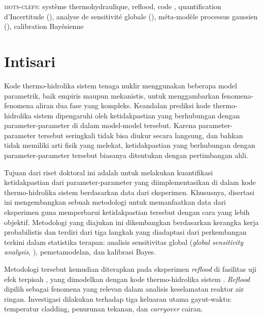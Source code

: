 \begin{otherlanguage}{ngerman}
\vfill

\textsc{mots-clefs}:
système thermohydraulique,
reflood,
code ,
quantification d'Incertitude (),
analyse de sensitivité globale (),
méta-modèle processus gaussien (),
calibration Bayésienne

\end{otherlanguage}

\newpage

\chapter*{Intisari}

Kode thermo-hidrolika sistem tenaga nuklir menggunakan beberapa model parametrik, baik empiris maupun mekanistis, untuk menggambarkan fenomena-fenomena aliran dua fase yang kompleks.   
Keandalan prediksi kode thermo-hidrolika sistem dipengaruhi oleh ketidakpastian yang berhubungan dengan parameter-parameter di dalam model-model tersebut.
Karena parameter-parameter tersebut seringkali tidak bisa diukur secara langsung, dan bahkan tidak memiliki arti fisik yang melekat, ketidakpastian yang berhubungan dengan parame\-ter-parameter tersebut biasanya ditentukan dengan pertimbangan ahli.

Tujuan dari riset doktoral ini adalah untuk melakukan kuantifikasi ketidakpastian dari parameter-parameter yang diimplementasikan di dalam kode thermo-hidrolika sistem berdasarkan data dari eksperimen.
Khususnya, disertasi ini mengembangkan sebuah metodologi untuk memanfaatkan data dari eksperimen guna memperbarui ketidakpastian tersebut dengan cara yang lebih objektif.
Metodologi yang diajukan ini dikembangkan berdasarkan kerangka kerja probabilistis dan terdiri dari tiga langkah yang diadaptasi dari perkembang\-an terkini dalam statistika terapan:
analisis sensitivitas global (\emph{global sensitivity analysis}, ), pemetamodelan, dan kalibrasi Bayes.

Metodologi tersebut kemudian diterapkan pada eksperimen \emph{reflood} di fasilitas uji efek terpisah , yang dimodelkan dengan kode thermo-hidrolika sistem .
\emph{Reflood} dipilih sebagai fenomena yang relevan dalam analisis keselamatan reaktor air ringan.
Investigasi dilakukan terhadap tiga keluaran utama gayut-waktu: temperatur cladding, penurunan tekanan, dan \emph{carryover} cairan.

